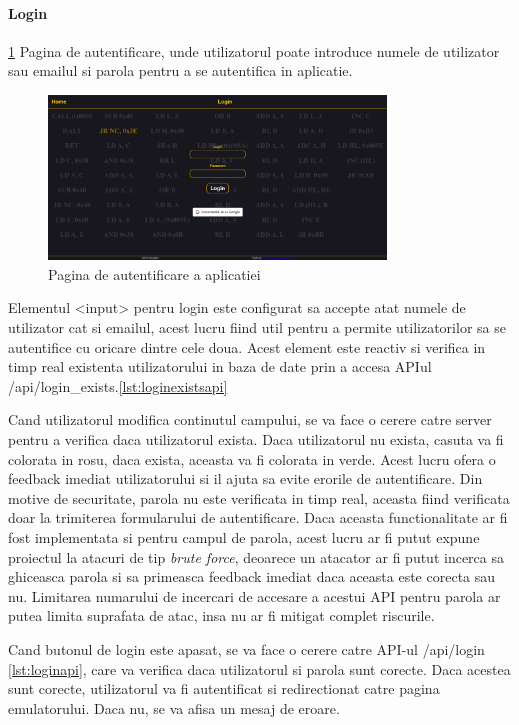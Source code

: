 \documentclass[titlepage,12pt]{article}
\DeclareRobustCommand{\code}[1]{{\ttfamily\small #1}}
\begin{document}
\paragraph {Login} \cref {fig:loginpage} Pagina de autentificare, unde utilizatorul poate introduce numele de utilizator sau emailul si parola pentru a se autentifica in aplicatie.
\begin{figure}[h!]
\centering
\includegraphics[width=0.8\textwidth]{images/loginpage.png}
\caption{Pagina de autentificare a aplicatiei}
\label{fig:loginpage}
\end{figure}

Elementul \code{<input>} pentru login este configurat sa accepte atat numele de utilizator cat si emailul, acest lucru fiind util pentru a permite utilizatorilor sa se autentifice cu oricare dintre cele doua. Acest element este reactiv si verifica in timp real existenta utilizatorului in baza de date prin a accesa APIul \code{/api/login\_exists}.\cref{lst:loginexistsapi}

Cand utilizatorul modifica continutul campului, se va face o cerere catre server pentru a verifica daca utilizatorul exista. Daca utilizatorul nu exista, casuta va fi colorata in rosu, daca exista, aceasta va fi colorata in verde. Acest lucru ofera o feedback imediat utilizatorului si il ajuta sa evite erorile de autentificare.
Din motive de securitate, parola nu este verificata in timp real, aceasta fiind verificata doar la trimiterea formularului de autentificare. Daca aceasta functionalitate ar fi fost implementata si pentru campul de parola, acest lucru ar fi putut expune proiectul la atacuri de tip \emph{brute force}, deoarece un atacator ar fi putut incerca sa ghiceasca parola si sa primeasca feedback imediat daca aceasta este corecta sau nu. Limitarea numarului de incercari de accesare a acestui API pentru parola ar putea limita suprafata de atac, insa nu ar fi mitigat complet riscurile.

Cand butonul de login este apasat, se va face o cerere catre API-ul \code{/api/login} \cref{lst:loginapi}, care va verifica daca utilizatorul si parola sunt corecte. Daca acestea sunt corecte, utilizatorul va fi autentificat si redirectionat catre pagina emulatorului. Daca nu, se va afisa un mesaj de eroare.
\end{document}

